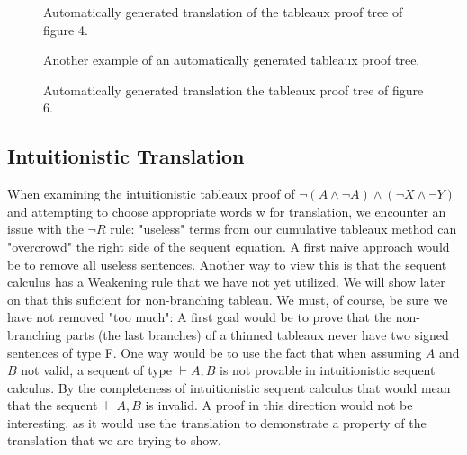 \documentclass[runningheads]{llncs}
\begin{document}
\begin{figure}

    {\fontsize{1}{1}\selectfont
\ocmalImageI

\caption{Automatically generated translation of the tableaux proof tree of figure 4.}
\label{fig:destructive_tableaux}
    }
\end{figure}



\begin{figure}

    {\fontsize{1}{1}\selectfont
\ocmalImageIII

\caption{Another example of an automatically generated tableaux proof tree.}
\label{fig:destructive_tableaux}
    }
\end{figure}


\begin{figure}

    {\fontsize{1}{1}\selectfont
\ocmalImageIIII

\caption{Automatically generated translation the tableaux proof tree of figure 6.}
\label{fig:destructive_tableaux}
    }
\end{figure}


\newpage
\subsection{Intuitionistic Translation}


When examining the intuitionistic tableaux proof of  $\neg (A \land \neg A) \land (\neg X \land \neg Y)$ and attempting to choose 
appropriate words w for translation, we encounter an issue with the $\neg R$ rule: 
"useless" terms from our cumulative tableaux method can "overcrowd" the right side of the sequent equation. 
A first naive approach would be to remove all useless sentences. 
Another way to view this is that the sequent calculus has a Weakening rule that we have not yet utilized.
We will show later on that this suficient for non-branching tableau.
\ThinningFunctionDefinition
We must, of course, be sure we have not removed "too much":
\thinnedInvalidityproof
\thinnedsizeproof
A first goal would be to prove that the non-branching parts (the last branches) of a thinned tableaux never have two signed sentences of type F.
One way would be to use the fact that when assuming $A$ and $B$ not valid, a sequent of type $ \vdash A, B$ is not provable in intuitionistic sequent calculus. 
By the completeness of intuitionistic sequent calculus that would mean that the sequent $ \vdash A, B$ is invalid. A proof in this direction would not be
 interesting, as it would use the translation to demonstrate a property of the translation that we are trying to show. 
\end{document}
